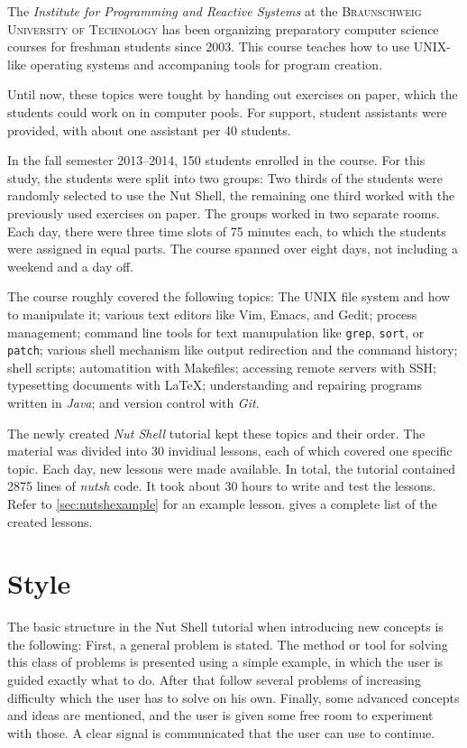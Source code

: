 \documentclass[paper=a4,abstract=on,cleardoublepage=empty,numbers=noenddot,toc=bib,12pt,appendixprefix=true]{scrreprt}
\begin{document}
The \textit{Institute for Programming and Reactive Systems} at the \textsc{Braunschweig University of Technology} has been organizing preparatory computer science courses for freshman students since 2003. This course teaches how to use UNIX-like operating systems and accompaning tools for program creation.

Until now, these topics were tought by handing out exercises on paper, which the students could work on in computer pools. For support, student assistants were provided, with about one assistant per 40 students.

In the fall semester 2013--2014, 150 students enrolled in the course. For this study, the students were split into two groups: Two thirds of the students were randomly selected to use the Nut Shell, the remaining one third worked with the previously used exercises on paper. The groups worked in two separate rooms. Each day, there were three time slots of 75 minutes each, to which the students were assigned in equal parts. The course spanned over eight days, not including a weekend and a day off.

The course roughly covered the following topics: The \textsc{UNIX} file system and how to manipulate it; various text editors like Vim, Emacs, and Gedit; process management; command line tools for text manupulation like \texttt{grep}, \texttt{sort}, or \texttt{patch}; various shell mechanism like output redirection and the command history; shell scripts; automatition with Makefiles; accessing remote servers with \textsc{SSH}; typesetting documents with \LaTeX; understanding and repairing programs written in \textit{Java}; and version control with \textit{Git}.

The newly created \textit{Nut Shell} tutorial kept these topics and their order. The material was divided into 30 invidiual lessons, each of which covered one specific topic. Each day, new lessons were made available. In total, the tutorial contained 2875 lines of \textit{nutsh} code. It took about 30 hours to write and test the lessons. Refer to \cref{sec:nutshexample} for an example lesson.  gives a complete list of the created lessons.

\section{Style}

The basic structure in the Nut Shell tutorial when introducing new concepts is the following: First, a general problem is stated. The method or tool for solving this class of problems is presented using a simple example, in which the user is guided exactly what to do. After that follow several problems of increasing difficulty which the user has to solve on his own. Finally, some advanced concepts and ideas are mentioned, and the user is given some free room to experiment with those. A clear signal is communicated that the user can use to continue.
\end{document}
